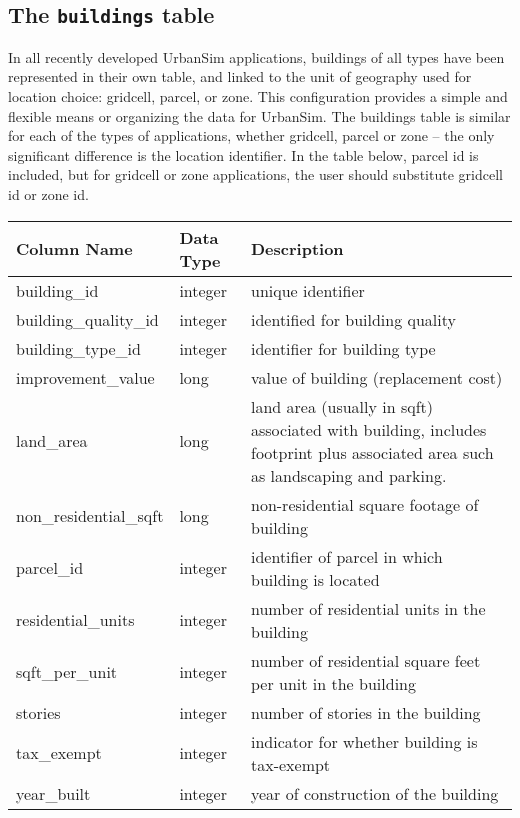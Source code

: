 \subsection{The {\tt buildings} table}

In all recently developed UrbanSim applications, buildings of all types have been represented in their own
table, and linked to the unit of geography used for location choice: gridcell, parcel, or zone.  This configuration
provides a simple and flexible means or organizing the data for UrbanSim.  The buildings table is similar
for each of the types of applications, whether gridcell, parcel or zone -- the only significant difference is the
location identifier.  In the table below, parcel id is included, but for gridcell or zone applications, the user
should substitute gridcell id or zone id.

\begin{tabular}{p{2in}lp{3.5in}}
\textbf{Column Name} & \textbf{Data Type} & \textbf{Description} \\
\hline
building\_id & integer & unique identifier \\ \hline
building\_quality\_id & integer & identified for building quality\\ \hline
building\_type\_id & integer & identifier for building type\\ \hline
improvement\_value & long & value of building (replacement cost)\\ \hline
land\_area & long & land area (usually in sqft) associated with building, includes footprint plus associated area such as landscaping and parking.\\ \hline
non\_residential\_sqft & long & non-residential square footage of building\\ \hline 
parcel\_id & integer & identifier of parcel in which building is located\\ \hline
residential\_units & integer & number of residential units in the building\\ \hline
sqft\_per\_unit & integer & number of residential square feet per unit in the building\\ \hline
stories & integer & number of stories in the building\\ \hline
tax\_exempt & integer & indicator for whether building is tax-exempt\\ \hline
year\_built & integer & year of construction of the building\\ \hline
\end{tabular}


